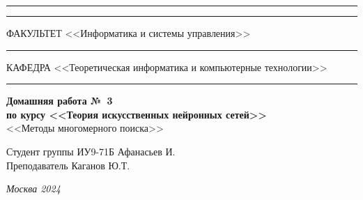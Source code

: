 \documentclass[a4paper, 14pt]{extarticle}
\begin{document}
\begin{titlepage}
\vspace{-25pt}
\hspace{-35pt}\rule{\textwidth}{2.3pt}

\vspace*{-20.3pt}
\hspace{-35pt}\rule{\textwidth}{0.4pt}

\vspace{1.5ex}
\hspace{-35pt} \noindent \small ФАКУЛЬТЕТ\hspace{80pt} <<Информатика и системы управления>>

\vspace*{-16pt}
\hspace{47pt}\rule{0.83\textwidth}{0.4pt}

\vspace{0.5ex}
\hspace{-35pt} \noindent \small КАФЕДРА\hspace{50pt} <<Теоретическая информатика и компьютерные технологии>>

\vspace*{-16pt}
\hspace{30pt}\rule{0.866\textwidth}{0.4pt}
  
\vspace{11em}

\begin{center}
\Large {\bf Домашняя работа №~3} \\ 
\large {\bf по курсу <<Теория искусственных нейронных сетей>>} \\
\large <<Методы многомерного поиска>> 
\end{center}\normalsize

\vspace{8em}


\begin{flushright}
  {Студент группы ИУ9-71Б Афанасьев И. \hspace*{15pt}\\ 
  \vspace{2ex}
  Преподаватель Каганов Ю.Т.\hspace*{15pt}}
\end{flushright}

\bigskip

\vfill
 

\begin{center}
\textsl{Москва 2024}
\end{center}
\end{titlepage}
\end{document}
